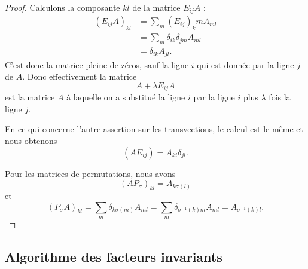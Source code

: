 \begin{proof}
    Calculons la composante \( kl\) de la matrice \( E_{ij}A\) :
    \begin{subequations}
        \begin{align}
            (E_{ij}A)_{kl}&=\sum_m(E_{ij})_kmA_{ml}\\
            &=\sum_m\delta_{ik}\delta_{jm}A_{ml}\\
            &=\delta_{ik}A_{jl}.
        \end{align}
    \end{subequations}
    C'est donc la matrice pleine de zéros, sauf la ligne \( i\) qui est donnée par la ligne \( j\) de \( A\). Donc effectivement la matrice
    \begin{equation}
        A+\lambda E_{ij}A
    \end{equation}
    est la matrice \( A\) à laquelle on a substitué la ligne \( i\) par la ligne \( i\) plus \( \lambda\) fois la ligne \( j\).

    En ce qui concerne l'autre assertion sur les transvections, le calcul est le même et nous obtenons
    \begin{equation}
        (AE_{ij})=A_{ki}\delta_{jl}.
    \end{equation}

    Pour les matrices de permutations, nous avons 
    \begin{equation}
        (AP_{\sigma})_{kl}=A_{k\sigma(l)}
    \end{equation}
    et
    \begin{equation}
        (P_{\sigma}A)_{kl}=\sum_m\delta_{k\sigma(m)}A_{ml}=\sum_m\delta_{\sigma^{-1}(k)m}A_{ml}=A_{\sigma^{-1}(k)l}.
    \end{equation}
\end{proof}


\subsection{Algorithme des facteurs invariants}

